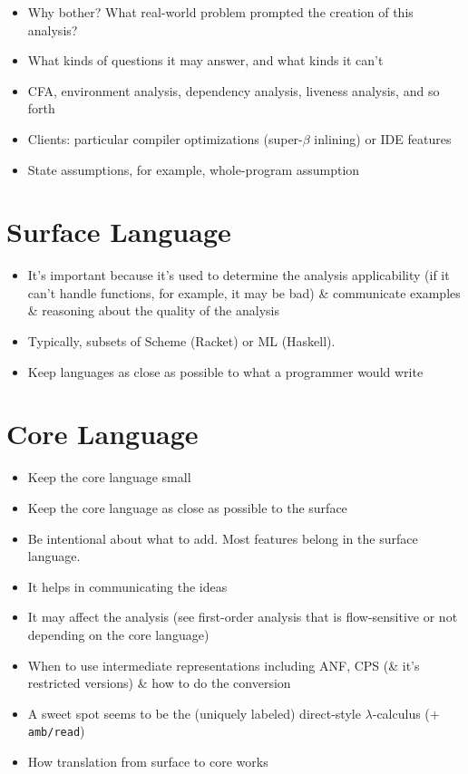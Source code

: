 \documentclass[12pt, oneside]{book}
\begin{document}
\begin{itemize}
  \item Why bother? What real-world problem prompted the creation of this analysis?
  \item What kinds of questions it may answer, and what kinds it can’t
  \item CFA, environment analysis, dependency analysis, liveness analysis, and so forth
  \item Clients: particular compiler optimizations (super-\(β\) inlining) or IDE features
  \item State assumptions, for example, whole-program assumption
\end{itemize}

\section{Surface Language}

\begin{itemize}
  \item It’s important because it’s used to determine the analysis applicability (if it can’t handle functions, for example, it may be bad) \& communicate examples \& reasoning about the quality of the analysis
  \item Typically, subsets of Scheme (Racket) or ML (Haskell).
  \item Keep languages as close as possible to what a programmer would write
\end{itemize}

\section{Core Language}

\begin{itemize}
  \item Keep the core language small
  \item Keep the core language as close as possible to the surface
  \item Be intentional about what to add. Most features belong in the surface language.
  \item It helps in communicating the ideas
  \item It may affect the analysis (see first-order analysis that is flow-sensitive or not depending on the core language)
  \item When to use intermediate representations including ANF, CPS (\& it’s restricted versions) \& how to do the conversion
  \item A sweet spot seems to be the (uniquely labeled) direct-style \(λ\)-calculus (+ \texttt{amb/read})
  \item How translation from surface to core works
\end{itemize}
\end{document}
